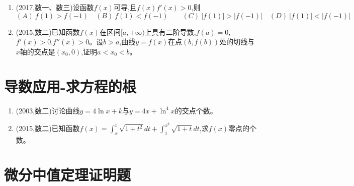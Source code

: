 \documentclass[12pt, a4paper, oneside, UTF8]{ctexbook}
\begin{document}
\begin{enumerate}[label=\arabic*.,start=21]
    \item  (2017,数一、数三)设函数$f(x)$可导,且$f(x)f'(x)>0$,则 \\
        $(A)\ f(1)>f(-1) \quad (B)\ f(1)<f(-1) \qquad
        (C)\ |f(1)| >|f(-1)| \quad (D)\ |f(1)|<|f(-1)| $
    
    \begin{solution}
    \newpage
    \end{solution}
    
    \item  (2015,数二)已知函数$f(x)$在区间$[a,+\infty)$上具有二阶导数,$f(a)=0$,$f'(x)>0$,$f''(x)>0$。设$b>a$,曲线$y=f(x)$在点$(b,f(b))$处的切线与$x$轴的交点是$(x_0,0)$,证明$a<x_0<b$。
    
    \begin{solution}
    \newpage
    \end{solution}
\end{enumerate}

\section{导数应用-求方程的根}

\begin{enumerate}[label=\arabic*.,start=23]
    \item  (2003,数二)讨论曲线$y=4\ln x+k$与$y=4x+\ln^4 x$的交点个数。
    
    \begin{solution}
    \newpage
    \end{solution}
    
    \item  (2015,数二)已知函数$f(x)=\int_x^1\sqrt{1+t^2}dt+\int_1^{x^2}\sqrt{1+t}dt$,求$f(x)$零点的个数。
    
    \begin{solution}
    \newpage
    \end{solution}
\end{enumerate}

\section{微分中值定理证明题}

\begin{remark}
\end{remark}
\end{document}
